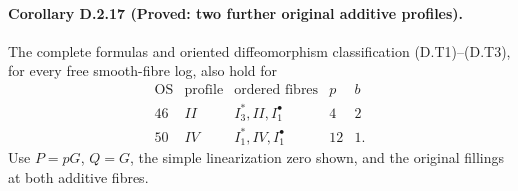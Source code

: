 \paragraph{Corollary D.2.17 (Proved: two further original additive profiles).}
The complete formulas and oriented diffeomorphism classification
(D.T1)--(D.T3), for every free smooth-fibre log, also hold for
\[
\begin{array}{c|c|l|r|r}
 \mathrm{OS}&\mathrm{profile}&\text{ordered fibres}&p&b\\\hline
 46&II&I_3^*,II,I_1^\bullet&4&2\\
 50&IV&I_1^*,IV,I_1^\bullet&12&1.
\end{array}
\]
Use $P=pG$, $Q=G$, the simple linearization zero shown,
and the original fillings at both additive fibres.
